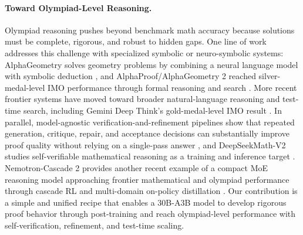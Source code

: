 \paragraph{Toward Olympiad-Level Reasoning.}
Olympiad reasoning pushes beyond benchmark math accuracy because solutions must
be complete, rigorous, and robust to hidden gaps. One line of work addresses this
challenge with specialized symbolic or neuro-symbolic systems: AlphaGeometry
solves geometry problems by combining a neural language model with symbolic
deduction \citep{trinh2024alphageometry}, and AlphaProof/AlphaGeometry 2 reached
silver-medal-level IMO performance through formal reasoning and search
\citep{deepmind2024alphaproof}. More recent frontier systems have moved toward
broader natural-language reasoning and test-time search, including Gemini Deep
Think's gold-medal-level IMO result \citep{deepmind2025geminiimo}. In parallel,
model-agnostic verification-and-refinement pipelines show that repeated
generation, critique, repair, and acceptance decisions can substantially improve
proof quality without relying on a single-pass answer \citep{huang2025winning},
and DeepSeekMath-V2 studies self-verifiable mathematical reasoning as a training
and inference target \citep{deepseekmathv2}. Nemotron-Cascade 2 provides another
recent example of a compact MoE reasoning model approaching frontier mathematical
and olympiad performance through cascade RL and multi-domain on-policy
distillation \citep{yang2026nemotroncascade2}. Our contribution is a simple and
unified recipe that enables a 30B-A3B model to develop rigorous proof behavior
through post-training and reach olympiad-level performance with
self-verification, refinement, and test-time scaling.
